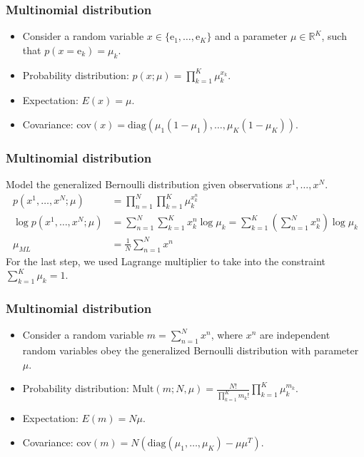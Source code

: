 \documentclass{beamer}
\begin{document}
\begin{frame}
    \frametitle{Multinomial distribution}
    \begin{itemize}
        \item Consider a random variable $x\in\{\mathrm{e}_{1},\hdots,\mathrm{e}_{K}\}$ and a parameter $\mu\in\mathbb{R}^{K}$, such that $p(x=\mathrm{e}_{k})=\mu_{k}$.
        \item Probability distribution: $p(x;\mu)=\prod_{k=1}^{K}\mu_{k}^{x_{k}}$.
        \item Expectation: $E(x)=\mu$.
        \item Covariance: $\mathrm{cov}(x)=\mathrm{diag}(\mu_{1}(1-\mu_{1}),\hdots,\mu_{K}(1-\mu_{K}))$.
    \end{itemize}
\end{frame}

\begin{frame}
    \frametitle{Multinomial distribution}
    Model the generalized Bernoulli distribution given observations $x^{1},\hdots,x^{N}$.
    \begin{align*}
        p(x^{1},\hdots,x^{N};\mu)&=\prod_{n=1}^{N}\prod_{k=1}^{K}\mu_{k}^{x^{n}_{k}} \\
        \log{}p(x^{1},\hdots,x^{N};\mu)&=\sum_{n=1}^{N}\sum_{k=1}^{K}x^{n}_{k}\log\mu_{k}=\sum_{k=1}^{K}(\sum_{n=1}^{N}x^{n}_{k})\log\mu_{k} \\
        \mu_{ML}&=\frac{1}{N}\sum_{n=1}^{N}x^{n}
    \end{align*}
    For the last step, we used Lagrange multiplier to take into the constraint $\sum_{k=1}^{K}\mu_{k}=1$.
\end{frame}

\begin{frame}
    \frametitle{Multinomial distribution}
    \begin{itemize}
        \item Consider a random variable $m=\sum_{n=1}^{N}x^{n}$, where $x^{n}$ are independent random variables obey the generalized Bernoulli distribution with parameter $\mu$.
        \item Probability distribution: $\mathrm{Mult}(m;N,\mu)=\frac{N!}{\prod_{k=1}^{K}m_{k}!}\prod_{k=1}^{K}\mu_{k}^{m_{k}}$.
        \item Expectation: $E(m)=N\mu$.
        \item Covariance: $\mathrm{cov}(m)=N(\mathrm{diag}(\mu_{1},\hdots,\mu_{K})-\mu\mu^{T})$.
    \end{itemize}
\end{frame}
\end{document}
